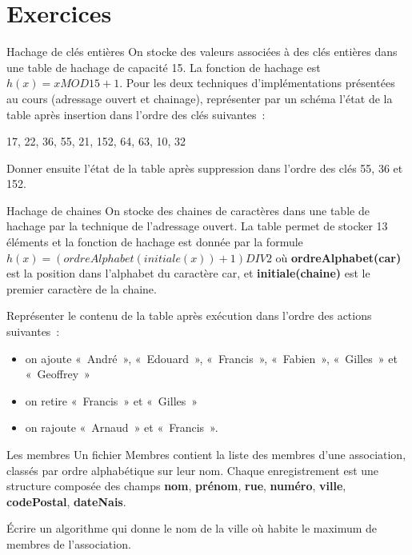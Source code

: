 \section{Exercices}

	\begin{Exercice}{Hachage de clés entières}
		On stocke des valeurs associées à des clés entières 
		dans une table de hachage de capacité 15.
		La fonction de hachage est $h(x) = x MOD 15 + 1$. 
		Pour les deux techniques d'implémentations présentées 
		au cours (adressage ouvert et chainage), représenter 
		par un schéma l'état de la table
		après insertion dans l'ordre des clés suivantes~: 

		{\centering
		{17, 22, 36, 55, 21, 152, 64, 63, 10, 32}
		\par}

		Donner ensuite l'état de la table après suppression
		dans l'ordre des clés 55, 36 et 152.

	\end{Exercice}
	
	\begin{Exercice}{Hachage de chaines}
		On stocke des chaines de caractères dans une table de hachage 
		par la technique de l'adressage ouvert. La table permet de
		stocker 13 éléments et la fonction de hachage est donnée 
		par la formule $h(x) = 	(ordreAlphabet(initiale(\textit{x})) + 1) DIV 2$ 
		où \textbf{ordreAlphabet(car)} est la position dans l'alphabet du caractère car,
		et \textbf{initiale(chaine)} est le premier caractère de la chaine.
		
		Représenter le contenu de la table après exécution 
		dans l'ordre des actions suivantes~:

		\begin{itemize}
			\item {
				on ajoute «~André~», «~Edouard~», «~Francis~», «~Fabien~», «~Gilles~» et «~Geoffrey~»}
			\item {
				on retire «~Francis~» et «~Gilles~» }
			\item {
				on rajoute «~Arnaud~» et «~Francis~».}
		\end{itemize}

	\end{Exercice}
	
	\begin{Exercice}{Les membres}
		Un fichier Membres contient la liste des membres d'une association, 
		classés par ordre alphabétique sur leur nom. Chaque enregistrement est une 
		structure composée des champs \textbf{nom}, \textbf{prénom}, \textbf{rue}, 
		\textbf{numéro}, \textbf{ville}, \textbf{codePostal}, \textbf{dateNais}.

		Écrire un algorithme qui donne le nom de la ville 
		où habite le maximum de membres de l'association.

	\end{Exercice}
	
